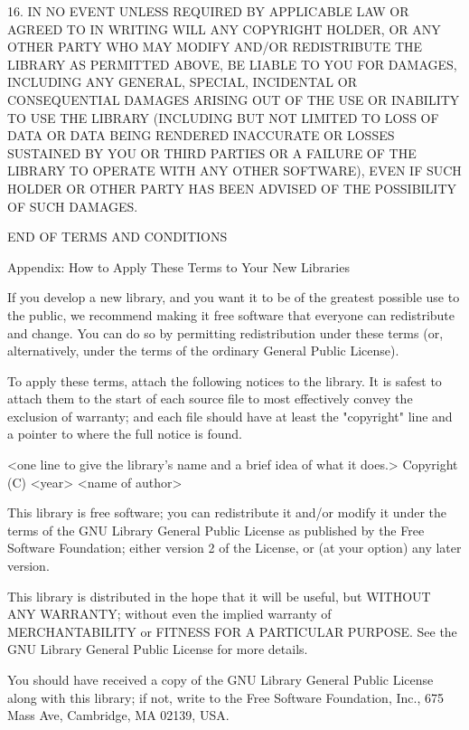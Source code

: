 \documentclass[twoside]{tceusermanual}
\begin{document}
  16. IN NO EVENT UNLESS REQUIRED BY APPLICABLE LAW OR AGREED TO IN
WRITING WILL ANY COPYRIGHT HOLDER, OR ANY OTHER PARTY WHO MAY MODIFY
AND/OR REDISTRIBUTE THE LIBRARY AS PERMITTED ABOVE, BE LIABLE TO YOU
FOR DAMAGES, INCLUDING ANY GENERAL, SPECIAL, INCIDENTAL OR CONSEQUENTIAL
DAMAGES ARISING OUT OF THE USE OR INABILITY TO USE THE
LIBRARY (INCLUDING BUT NOT LIMITED TO LOSS OF DATA OR DATA BEING
RENDERED INACCURATE OR LOSSES SUSTAINED BY YOU OR THIRD PARTIES OR A
FAILURE OF THE LIBRARY TO OPERATE WITH ANY OTHER SOFTWARE), EVEN IF
SUCH HOLDER OR OTHER PARTY HAS BEEN ADVISED OF THE POSSIBILITY OF SUCH DAMAGES.

\begin{center}
END OF TERMS AND CONDITIONS
\end{center}

\begin{center}
Appendix: How to Apply These Terms to Your New Libraries
\end{center}

If you develop a new library, and you want it to be of the
greatest possible use to the public, we recommend making it free
software that everyone can redistribute and change.  You can do
so by permitting redistribution under these terms (or,
alternatively, under the terms of the ordinary General Public
License).

To apply these terms, attach the following notices to the
library.  It is safest to attach them to the start of each
source file to most effectively convey the exclusion of
warranty; and each file should have at least the "copyright"
line and a pointer to where the full notice is found.

    <one line to give the library's name and a brief idea of what it does.>
    Copyright (C) <year>  <name of author>

    This library is free software; you can redistribute it and/or
    modify it under the terms of the GNU Library General Public
    License as published by the Free Software Foundation; either
    version 2 of the License, or (at your option) any later version.

    This library is distributed in the hope that it will be useful,
    but WITHOUT ANY WARRANTY; without even the implied warranty of
    MERCHANTABILITY or FITNESS FOR A PARTICULAR PURPOSE.  See the GNU
    Library General Public License for more details.

    You should have received a copy of the GNU Library General Public
    License along with this library; if not, write to the Free
    Software Foundation, Inc., 675 Mass Ave, Cambridge, MA 02139, USA.
\end{document}

